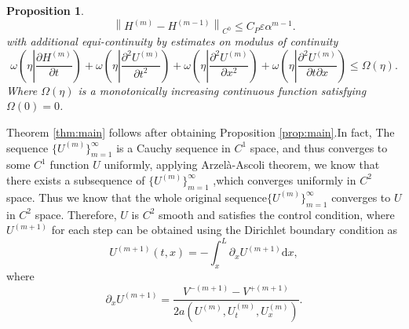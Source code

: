 \documentclass[a4paper,reqno,11pt]{amsart}
\numberwithin{equation}{section} %
\newtheorem{prop}[lem]{Proposition}
\begin{document}
\begin{prop}
\begin{equation}\label{cauchy h}
\left\lVert  H^{\left( m \right)}-H^{\left( m-1 \right)}\right\rVert  _{C^0}\leq C_P\varepsilon \alpha ^{m-1}.
\end{equation}
with additional equi-continuity by estimates on modulus of continuity
\begin{equation}\label{modulus of continuity}
\omega \left( \eta \left| \frac{\partial H^{\left( m \right)}}{\partial t} \right. \right) +\omega \left(  \eta \left|\frac{\partial ^2U^{\left( m \right)}}{\partial t^2} \right. \right) +\omega \left( \eta \left|\frac{\partial ^2U^{\left( m \right)}}{\partial x^2} \right.  \right) +\omega \left( \eta \left|\frac{\partial ^2U^{\left( m \right)}}{\partial t\partial x} \right. \right) \leq \Omega \left( \eta \right) .
\end{equation}
Where  $\Omega(\eta)$ is a monotonically increasing continuous function satisfying $\Omega(0)=0$.
\end{prop}
Theorem \ref{thm:main} follows after obtaining Proposition \ref{prop:main}.In fact, The sequence $\{U ^{(m)}\} _{m=1} ^ \infty $ is a Cauchy sequence in $C^1$ space, and thus converges to some $C^1$ function $ U$ uniformly, applying Arzelà-Ascoli theorem, we know that there exists a subsequence of $\{U ^{(m)}\} _{m=1} ^\infty $ ,which converges uniformly in $C^2$ space. Thus we know that the whole original sequence$\{U ^{(m)}\} _{m=1} ^\infty $ converges to $U$ in $C^2$ space. Therefore, $U$ is $C^2$ smooth and satisfies the control condition, where $U^(m+1)$ for each step can be 
obtained using the Dirichlet boundary condition as
$$
U^{(m+1)}(t,x)=-\int_x^L \partial _x U^{(m+1)} \text{d} x,
$$
where
$$
\partial _x U^{(m+1)}=\frac{V^{-\left( m+1 \right) }-V^{+\left( m+1 \right)}}{ 2a\left({U}^{\left( m \right)} ,U_{t}^{\left( m \right)},U_{x}^{\left( m \right)} \right)}.
$$
\end{document}

